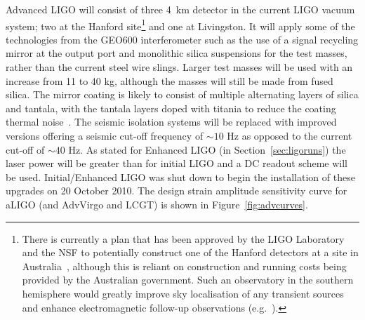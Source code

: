 \documentclass{article}
\begin{document}
Advanced LIGO will consist of three 4~km detector in the current LIGO vacuum
system; two at the Hanford site\footnote{There is currently a plan that
has been approved by the LIGO Laboratory and the NSF to potentially construct
one of the Hanford detectors at a site in Australia~\cite{Marx:2010}, although
this is reliant on construction and running costs being provided by the
Australian government. Such an observatory in the southern hemisphere would
greatly improve sky localisation of any transient sources and enhance
electromagnetic follow-up observations (e.g.~\cite{Barriga:2010}).} and one at
Livingston. It will apply some of the technologies from the GEO600
interferometer such as the use of a signal recycling mirror at the output port
and monolithic silica suspensions for the test masses, rather than the current
steel wire slings. Larger test masses will be used with an increase from 11 to
40 kg, although the masses will still be made from fused silica. The mirror
coating is likely to consist of multiple alternating layers of silica and
tantala, with the tantala layers doped with titania to reduce the coating
thermal noise~\cite{Agresti:2006}. The seismic isolation systems will be
replaced with improved versions offering a seismic cut-off frequency of $\sim10$
Hz as opposed to the current cut-off of $\sim40$ Hz. As stated for Enhanced LIGO
(in Section~\ref{sec:ligoruns}) the laser power will be greater than for initial
LIGO and a DC readout scheme will be used. Initial/Enhanced LIGO was shut down
to begin the installation of these upgrades on 20 October 2010. The design
strain amplitude sensitivity curve for aLIGO (and AdvVirgo and LCGT) is shown
in Figure~\ref{fig:advcurves}.

\end{document}
